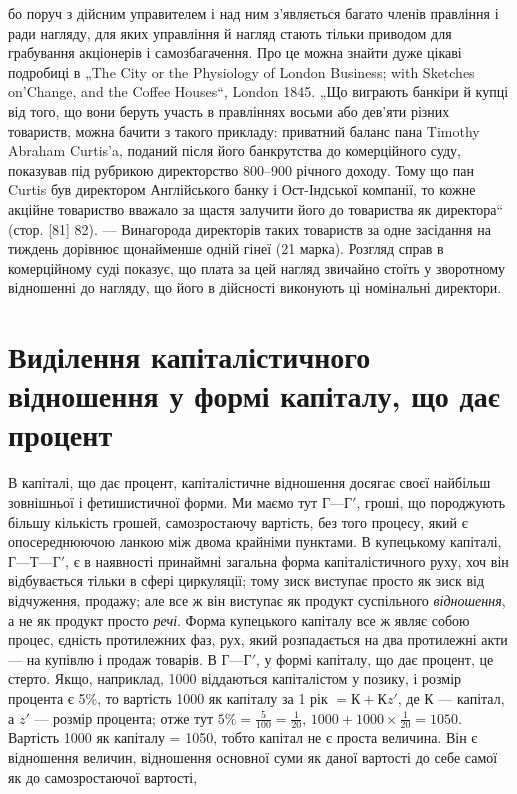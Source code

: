 \parcont{}  %
бо поруч з дійсним управителем і над ним з’являється багато
членів правління і ради нагляду, для яких управління й нагляд
стають тільки приводом для грабування акціонерів і самозбагачення.
Про це можна знайти дуже цікаві подробиці в „The
City or the Physiology of London Business; with Sketches on’Change,
and the Coffee Houses“, London 1845. „Що виграють банкіри
й купці від того, що вони беруть участь в правліннях
восьми або дев’яти різних товариств, можна бачити з такого
прикладу: приватний баланс пана Timothy Abraham Curtis’a, поданий
після його банкрутства до комерційного суду, показував
під рубрикою директорство 800--900 річного
доходу. Тому що пан Curtis був директором Англійського банку
і Ост-Індської компанії, то кожне акційне товариство вважало за
щастя залучити його до товариства як директора“ (стор. [81] 82). —
Винагорода директорів таких товариств за одне засідання на
тиждень дорівнює щонайменше одній гінеї (21 марка). Розгляд
справ в комерційному суді показує, що плата за цей нагляд
звичайно стоїть у зворотному відношенні до нагляду, що його
в дійсності виконують ці номінальні директори.

\section{Виділення капіталістичного відношення у формі
капіталу, що дає процент}

В капіталі, що дає процент, капіталістичне відношення досягає
своєї найбільш зовнішньої і фетишистичної форми. Ми
маємо тут $Г — Г'$, гроші, що породжують більшу кількість грошей,
самозростаючу вартість, без того процесу, який є опосереднюючою
ланкою між двома крайніми пунктами. В купецькому
капіталі, $Г — Т — Г'$, є в наявності принаймні загальна форма
капіталістичного руху, хоч він відбувається тільки в сфері циркуляції;
тому зиск виступає просто як зиск від відчуження, продажу;
але все ж він виступає як продукт суспільного \emph{відношення}, а не
як продукт просто \emph{речі}. Форма купецького капіталу все ж
являє собою процес, єдність протилежних фаз, рух, який розпадається
на два протилежні акти — на купівлю і продаж товарів.
В $Г — Г'$, у формі капіталу, що дає процент, це стерто. Якщо,
наприклад, 1000 віддаються капіталістом у позику,
і розмір процента є 5\%, то вартість 1000
як капіталу за 1 рік $= К + Кz'$, де $К$ — капітал, а $z'$ —
розмір процента; отже тут $5\% = \frac{5}{100} = \frac{1}{20}$,
$1000 + 1000 × \frac{1}{20} = 1050$. Вартість 1000 як
капіталу = 1050, тобто капітал не є проста
величина. Він є відношення величин, відношення основної суми
як даної вартості до себе самої як до самозростаючої вартості,
\parbreak{}  %
